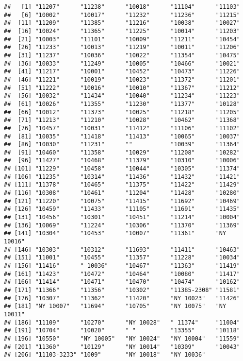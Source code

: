 \documentclass[
]{article}
\begin{document}
\begin{verbatim}
##   [1] "11207"      "11238"      "10018"      "11104"      "11103"     
##   [6] "10002"      "10017"      "11232"      "11236"      "11215"     
##  [11] "11209"      "11385"      "11216"      "10038"      "10027"     
##  [16] "10024"      "11365"      "11225"      "10014"      "11203"     
##  [21] "10003"      "11101"      "10009"      "11211"      "10454"     
##  [26] "11233"      "10013"      "11219"      "10011"      "11206"     
##  [31] "11237"      "10036"      "10022"      "11354"      "10475"     
##  [36] "10033"      "11249"      "10005"      "10466"      "10021"     
##  [41] "11217"      "10001"      "10452"      "10473"      "11226"     
##  [46] "11221"      "10019"      "10023"      "11372"      "11201"     
##  [51] "11222"      "10016"      "10010"      "11367"      "11212"     
##  [56] "10032"      "11434"      "10040"      "11234"      "11223"     
##  [61] "10026"      "11355"      "11230"      "11377"      "10128"     
##  [66] "10012"      "11373"      "10025"      "11218"      "11205"     
##  [71] "11213"      "11210"      "10028"      "10462"      "11368"     
##  [76] "10457"      "10031"      "11412"      "11106"      "11102"     
##  [81] "10035"      "11418"      "11413"      "10065"      "10037"     
##  [86] "10030"      "11231"      ""           "10039"      "11364"     
##  [91] "10460"      "11358"      "10029"      "11208"      "10282"     
##  [96] "11427"      "10468"      "11379"      "10310"      "10006"     
## [101] "11229"      "10458"      "10044"      "10305"      "11374"     
## [106] "11235"      "10314"      "11436"      "11432"      "11421"     
## [111] "11378"      "10465"      "11375"      "11422"      "11429"     
## [116] "10308"      "10461"      "11204"      "11428"      "10280"     
## [121] "11220"      "10075"      "11415"      "11692"      "10469"     
## [126] "10459"      "11433"      "11105"      "11691"      "11435"     
## [131] "10456"      "10301"      "10451"      "11214"      "10004"     
## [136] "10069"      "11224"      "10306"      "11370"      "11369"     
## [141] "10304"      "10453"      "10007"      "11361"      "NY 10016"  
## [146] "10303"      "10312"      "11693"      "11411"      "10463"     
## [151] "11001"      "10455"      "11357"      "11228"      "10034"     
## [156] "11416"      " 10036"     "10467"      "11363"      "11419"     
## [161] "11423"      "10472"      "10464"      "10080"      "11417"     
## [166] "11414"      "10471"      "10470"      "10474"      "10162"     
## [171] "11366"      "11356"      "10302"      "11385-2308" "11581"     
## [176] "10307"      "11362"      "11420"      "NY 10023"   "11426"     
## [181] "NY 10007"   "11694"      "10705"      "NY 10075"   "NY 10011"  
## [186] "11109"      "10270"      "NY 10028"   " 11374"     "11004"     
## [191] "10704"      "10020"      " "          "13355"      "10118"     
## [196] "10550"      "NY 10005"   "NY 10024"   "NY 10004"   "11559"     
## [201] "11360"      "10129"      "NY 10014"   "10309"      "10043"     
## [206] "11103-3233" "1009"       "NY 10018"   "NY 10036"
\end{verbatim}
\end{document}
